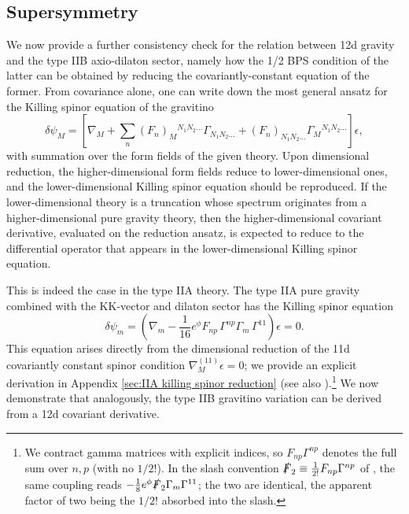 \subsection{Supersymmetry}
We now provide a further consistency check for the relation between 12d gravity and the type IIB axio-dilaton sector, namely how the 1/2 BPS condition of the latter can be obtained by reducing the covariantly-constant equation of the former.
From covariance alone, one can write down the most general ansatz for the Killing spinor equation of the gravitino
\begin{equation}
\delta\psi_M
= 
\left[
\nabla_M+\sum_n(F_{n})_M{}^{N_1N_2...}\Gamma_{N_1 N_2...} 
+ (F_{n})_{N_1N_2...}\Gamma_M{}^{N_1N_2...}
\right]\epsilon,
\end{equation}
with summation over the form fields of the given theory.
Upon dimensional reduction, the higher-dimensional form fields reduce to lower-dimensional ones, and the lower-dimensional Killing spinor equation should be reproduced.
If the lower-dimensional theory is a truncation whose spectrum originates from a higher-dimensional pure gravity theory, then the higher-dimensional covariant derivative, evaluated on the reduction ansatz, is expected to reduce to the differential operator that appears in the lower-dimensional Killing spinor equation.

This is indeed the case in the type IIA theory.
The type IIA pure gravity combined with the KK-vector and dilaton sector has the Killing spinor equation
\begin{equation}
\delta \psi_m =
\left(
\nabla_m - \frac{1}{16}e^\phi F_{np}\,\Gamma^{np}\Gamma_m\, \Gamma^{11}
\right)\epsilon = 0.
\label{IIA Killing spinor equation}
\end{equation}
This equation arises directly from the dimensional reduction of the 11d covariantly constant spinor condition $\nabla^{(11)}_M\epsilon = 0$; we provide an explicit derivation in Appendix \ref{sec:IIA killing spinor reduction} (see also \cite{Becker:2006dvp}).\footnote{
We contract gamma matrices with explicit indices, so $F_{np}\Gamma^{np}$ denotes the full sum over $n,p$ (with no $1/2!$). In the slash convention $\slashed{F}_2\equiv\frac{1}{2!}F_{np}\Gamma^{np}$ of \cite{Becker:2006dvp}, the same coupling reads $-\frac{1}{8}e^\phi\slashed{F}_2\Gamma_m\Gamma^{11}$; the two are identical, the apparent factor of two being the $1/2!$ absorbed into the slash.}
We now demonstrate that analogously, the type IIB gravitino variation can be derived from a 12d covariant derivative.


